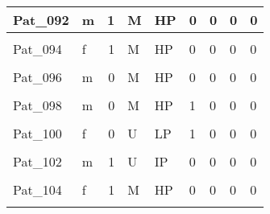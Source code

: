 \documentclass[11pt, a4paper, twosided]{book}
\begin{document}
\begin{longtable}[t]{l|l|r|l|l|l|l|l|l}
\hline
Pat\_092 & m & 1 & M & HP & 0 & 0 & 0 & 0\\
\hline
\cellcolor[HTML]{E2E868}{Pat\_093} & \cellcolor[HTML]{E2E868}{m} & \cellcolor[HTML]{E2E868}{0} & \cellcolor[HTML]{E2E868}{M} & \cellcolor[HTML]{E2E868}{HP} & \cellcolor[HTML]{E2E868}{1} & \cellcolor[HTML]{E2E868}{0} & \cellcolor[HTML]{E2E868}{0} & \cellcolor[HTML]{E2E868}{0}\\
\hline
Pat\_094 & f & 1 & M & HP & 0 & 0 & 0 & 0\\
\hline
\cellcolor[HTML]{E2E868}{Pat\_095} & \cellcolor[HTML]{E2E868}{m} & \cellcolor[HTML]{E2E868}{1} & \cellcolor[HTML]{E2E868}{U} & \cellcolor[HTML]{E2E868}{LP} & \cellcolor[HTML]{E2E868}{0} & \cellcolor[HTML]{E2E868}{0} & \cellcolor[HTML]{E2E868}{0} & \cellcolor[HTML]{E2E868}{0}\\
\hline
Pat\_096 & m & 0 & M & HP & 0 & 0 & 0 & 0\\
\hline
\cellcolor[HTML]{E2E868}{Pat\_097} & \cellcolor[HTML]{E2E868}{f} & \cellcolor[HTML]{E2E868}{1} & \cellcolor[HTML]{E2E868}{U} & \cellcolor[HTML]{E2E868}{LP} & \cellcolor[HTML]{E2E868}{0} & \cellcolor[HTML]{E2E868}{0} & \cellcolor[HTML]{E2E868}{0} & \cellcolor[HTML]{E2E868}{0}\\
\hline
Pat\_098 & m & 0 & M & HP & 1 & 0 & 0 & 0\\
\hline
\cellcolor[HTML]{E2E868}{Pat\_099} & \cellcolor[HTML]{E2E868}{f} & \cellcolor[HTML]{E2E868}{0} & \cellcolor[HTML]{E2E868}{U} & \cellcolor[HTML]{E2E868}{LP} & \cellcolor[HTML]{E2E868}{1} & \cellcolor[HTML]{E2E868}{0} & \cellcolor[HTML]{E2E868}{0} & \cellcolor[HTML]{E2E868}{0}\\
\hline
Pat\_100 & f & 0 & U & LP & 1 & 0 & 0 & 0\\
\hline
\cellcolor[HTML]{E2E868}{Pat\_101} & \cellcolor[HTML]{E2E868}{f} & \cellcolor[HTML]{E2E868}{0} & \cellcolor[HTML]{E2E868}{U} & \cellcolor[HTML]{E2E868}{LP} & \cellcolor[HTML]{E2E868}{1} & \cellcolor[HTML]{E2E868}{0} & \cellcolor[HTML]{E2E868}{0} & \cellcolor[HTML]{E2E868}{0}\\
\hline
Pat\_102 & m & 1 & U & IP & 0 & 0 & 0 & 0\\
\hline
\cellcolor[HTML]{E2E868}{Pat\_103} & \cellcolor[HTML]{E2E868}{f} & \cellcolor[HTML]{E2E868}{0} & \cellcolor[HTML]{E2E868}{M} & \cellcolor[HTML]{E2E868}{HP} & \cellcolor[HTML]{E2E868}{1} & \cellcolor[HTML]{E2E868}{0} & \cellcolor[HTML]{E2E868}{1} & \cellcolor[HTML]{E2E868}{0}\\
\hline
Pat\_104 & f & 1 & M & HP & 0 & 0 & 0 & 0\\
\hline
\cellcolor[HTML]{E2E868}{Pat\_105} & \cellcolor[HTML]{E2E868}{m} & \cellcolor[HTML]{E2E868}{0} & \cellcolor[HTML]{E2E868}{U} & \cellcolor[HTML]{E2E868}{LP} & \cellcolor[HTML]{E2E868}{NA} & \cellcolor[HTML]{E2E868}{NA} & \cellcolor[HTML]{E2E868}{NA} & \cellcolor[HTML]{E2E868}{NA}\\

\end{longtable}
\end{document}

